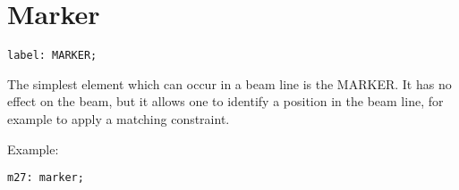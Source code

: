 
\section{Marker}
\label{sec:marker}

\begin{verbatim}
label: MARKER;
\end{verbatim} 
The simplest element which can occur in a beam line is the MARKER. It
has no effect on the beam, but it allows one to identify a position in
the beam line, for example to apply a matching constraint.  

Example: 
\begin{verbatim}
m27: marker;
\end{verbatim}


